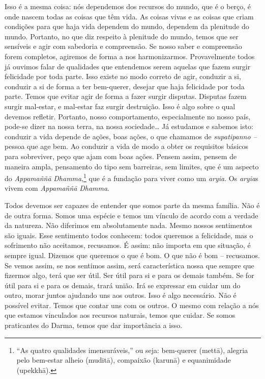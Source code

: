 Isso é a mesma coisa: nós dependemos dos recursos do mundo, que é o
berço, é onde nascem todas as coisas que têm vida. As coisas vivas e as
coisas que criam condições para que haja vida dependem do mundo,
dependem da plenitude do mundo. Portanto, no que diz respeito à
plenitude do mundo, temos que ser sensíveis e agir com sabedoria e
compreensão. Se nosso saber e compreensão forem completos, agiremos de
forma a nos harmonizarmos. Provavelmente todos já ouvimos falar de
qualidades que entendemos serem aquelas que fazem surgir felicidade por
toda parte. Isso existe no modo correto de agir, conduzir a si,
conduzir a si de forma a ter bem-querer, desejar que haja felicidade
por toda parte. Temos que evitar agir de forma a fazer surgir disputas.
Disputas fazem surgir mal-estar, e mal-estar faz surgir destruição.
Isso é algo sobre o qual devemos refletir. Portanto, nosso
comportamento, especialmente no nosso país, pode-se dizer na nossa
terra, na nossa sociedade\ldots{} Já estudamos e sabemos isto: conduzir a vida
depende de ações, boas ações, o que chamamos de \textit{supatipanno –
}pessoa que age bem. Ao conduzir a vida de modo a obter os requisitos
básicos para sobreviver, peço que ajam com boas ações. Pensem assim,
pensem de maneira ampla, pensamento do tipo sem barreiras, sem limites,
que é um aspecto do \textit{Appamaññā} \textit{Dhamma},\footnote{“As
quatro qualidades imensuráveis,” ou seja: bem-querer (mettā), alegria
pelo bem-estar alheio (muditā), compaixão (karunā) e equanimidade
(upekkhā).} que é a fundação para viver como um \textit{aryia}. Os
\textit{aryia}s vivem com \textit{Appamaññā} \textit{Dhamma}. 

Todos devemos ser capazes de entender que somos parte da mesma
família. Não é de outra forma. Somos uma espécie e temos um vínculo de
acordo com a verdade da natureza. Não diferimos em absolutamente nada.
Mesmo nossos sentimentos são iguais. Esse sentimento todos conhecem:
todos queremos a felicidade, mas o sofrimento não aceitamos, recusamos.
É assim: não importa em que situação, é sempre igual. Dizemos que
queremos o que é bom. O que não é bom – recusamos. Se vemos assim, se
nos sentimos assim, será característica nossa que sempre que fizermos
algo, terá que ser útil. Ser útil para si e para os demais também. Se
for útil para si e para os demais, trará união. Irá se expressar em
cuidar um do outro, morar juntos ajudando uns aos outros. Isso é algo
necessário. Não é possível evitar. Temos que contar uns com os outros.
O mesmo com relação a nós que estamos vinculados aos recursos naturais,
temos que cuidar. Se somos praticantes do Darma, temos que dar
importância a isso. 

